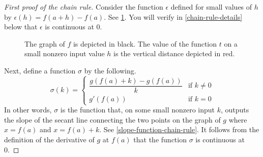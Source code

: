 \begin{proof}[First proof of the chain rule]
	Consider the function $\epsilon$ defined for small values of $h$ by $\epsilon(h) = f(a+h)-f(a)$. See \cref{value-difference-chain-rule}. You will verify in \cref{chain-rule-details} below that $\epsilon$ is continuous at 0. 
	
	\begin{figure}
		\begin{center}
		\end{center}
		\caption{The graph of $f$ is depicted in black. The value of the function $t$ on a small nonzero input value $h$ is the vertical distance depicted in red.}  \label{value-difference-chain-rule}
	\end{figure}

	Next, define a function $\sigma$ by the following.  
	\[ \sigma(k) = \begin{cases} \dfrac{g(f(a)+k) - g(f(a))}{k} & \text{if } k \neq 0 \\ g'(f(a)) & \text{if } k = 0 \end{cases} \]
	In other words, $\sigma$ is the function that, on some small nonzero input $k$, outputs the slope of the secant line connecting the two points on the graph of $g$ where $x = f(a)$ and $x = f(a) + k$. See \cref{slope-function-chain-rule}. It follows from the definition of the derivative of $g$ at $f(a)$ that the function $\sigma$ is continuous at 0. 
	

\end{proof}
